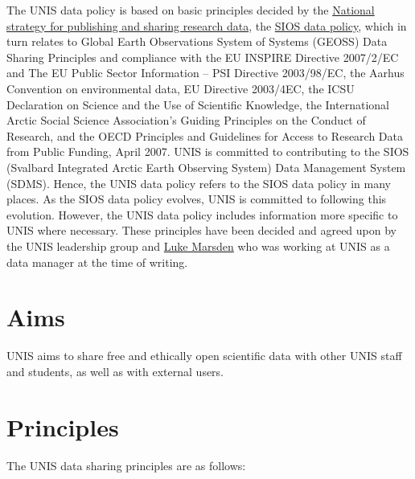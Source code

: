 \documentclass[a4paper,english, 11pt]{article}
\begin{document}
The UNIS data policy is based on basic principles decided by the \href{https://www.regjeringen.no/no/dokumenter/nasjonal-strategi-for-tilgjengeliggjoring-og-deling-av-forskningsdata/id2582412/}{National strategy for publishing and sharing research data}, the \href{https://sios-svalbard.org/sites/sios-svalbard.org/files/common/SIOS_Data_Policy.pdf}{SIOS data policy}, which in turn relates to Global Earth Observations System of Systems (GEOSS) Data Sharing Principles and compliance with the EU INSPIRE Directive 2007/2/EC and The EU Public Sector Information – PSI Directive 2003/98/EC, the Aarhus Convention on environmental
data, EU Directive 2003/4EC, the ICSU Declaration on Science and the Use of Scientific Knowledge, the International Arctic Social Science Association’s Guiding Principles on the
Conduct of Research, and the OECD Principles and Guidelines for Access to Research Data from Public Funding, April 2007. UNIS is committed to contributing to the SIOS (Svalbard Integrated Arctic Earth Observing System) Data Management System (SDMS). Hence, the UNIS data policy refers to the SIOS data policy in many places. As the SIOS data policy evolves, UNIS is committed to following this evolution. However, the UNIS data policy includes information more specific to UNIS where necessary. These principles have been decided and agreed upon by the UNIS leadership group and \href{https://orcid.org/0000-0002-9746-544X}{Luke Marsden} who was working at UNIS as a data manager at the time of writing.  

\section{Aims}
\label{s:aims}

UNIS aims to share free and ethically open scientific data with other UNIS staff and students, as well as with external users. 

\section{Principles}
\label{s:principles}

The UNIS data sharing principles are as follows:
\end{document}
